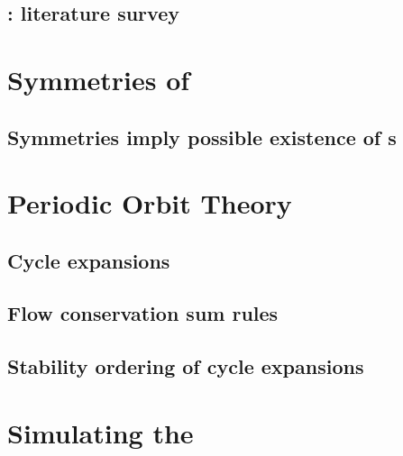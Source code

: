 \documentclass[hyperref]{inputs/gatech-thesis}
\begin{document}
    \section{\KS: literature survey}
        \label{sec:KSlit}
        

\chapter{\KSe}
\label{chap:pCf}
%    

\chapter{Symmetries of \KS}
\label{chap:Symmetry}
    \section{Symmetries imply possible existence of \rpo s}
        \label{sec:SymRPO}
        

\chapter{Periodic Orbit Theory}
\label{chap:POT}

    \section{Cycle expansions}

    \section{Flow conservation sum rules}
        \label{s-Cons-m-flow}
        

    \section{Stability ordering of cycle expansions}
        \label{s-StabOrd}
        




\chapter{Simulating the \KSe}
\label{chap:Numerics}
\end{document}
